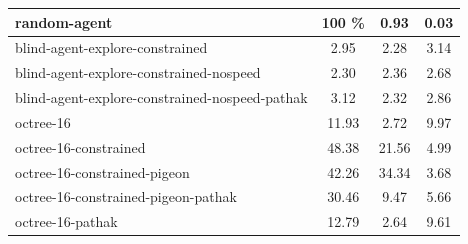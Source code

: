 \begin{longtable}{|l|c|c|c|}
    \\ \hline
    random-agent	&	100	\%	&	0.93	&	0.03	\\ \hline
blind-agent-explore-constrained & 2.95 & {\cellcolor[HTML]{EBF2F0}} \color[HTML]{000000} 2.28 & 3.14 \\ \hline
blind-agent-explore-constrained-nospeed & 2.30 & {\cellcolor[HTML]{EAF2F0}} \color[HTML]{000000} 2.36 & 2.68 \\ \hline
blind-agent-explore-constrained-nospeed-pathak & 3.12 & {\cellcolor[HTML]{EBF2F0}} \color[HTML]{000000} 2.32 & 2.86 \\ \hline
octree-16 & 11.93 & {\cellcolor[HTML]{E9F1EF}} \color[HTML]{000000} 2.72 & 9.97 \\ \hline
octree-16-constrained & 48.38 & {\cellcolor[HTML]{90C7BC}} \color[HTML]{000000} 21.56 & 4.99 \\ \hline
octree-16-constrained-pigeon & 42.26 & {\cellcolor[HTML]{55AA99}} \color[HTML]{F1F1F1} 34.34 & 3.68 \\ \hline
octree-16-constrained-pigeon-pathak & 30.46 & {\cellcolor[HTML]{C9E2DC}} \color[HTML]{000000} 9.47 & 5.66 \\ \hline
octree-16-pathak & 12.79 & {\cellcolor[HTML]{E9F1EF}} \color[HTML]{000000} 2.64 & 9.61 \\ \hline

\end{longtable}
